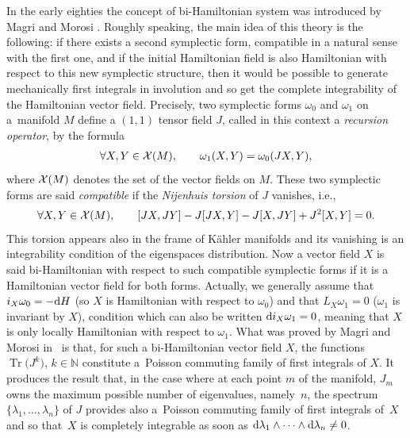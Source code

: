 \documentclass[pdftex]{sigma}%
\numberwithin{equation}{section}
\begin{document}
In the early eighties the concept of bi-Hamiltonian system was introduced by Magri and Morosi \cite{MaMo}. Roughly speaking, the main idea of this theory is the following: if there exists a second symplectic form, compatible in a natural sense with the first one, and if the initial Hamiltonian field is also Hamiltonian with respect to this new symplectic structure, then it would be possible to generate mechanically first integrals in involution and so get the complete integrability of the Hamiltonian vector field. Precisely, two symplectic forms $\omega_0$ and $\omega_1$ on a~manifold $M$ define a $(1,1)$ tensor field $J$, called in this context a {\it recursion operator}, by the formula
\begin{gather*}
\forall X,Y\in{\cal X}(M),\qquad \omega_1(X,Y)=\omega_0(JX,Y),
\end{gather*}
where ${\cal X}(M)$ denotes the set of the vector fields on $M$.
These two symplectic forms are said {\it compatible} if the {\it Nijenhuis torsion} of $J$ \cite{Nij} vanishes, i.e.,
\begin{gather*}
\forall X,Y\in{\cal X}(M),\qquad [JX,JY]-J[JX,Y]-J[X,JY]+J^2[X,Y]=0.
\end{gather*}
This torsion appears also in the frame of K\"ahler manifolds and its vanishing is an integrability condition of the eigenspaces distribution.
Now a vector field $X$ is said bi-Hamiltonian with respect to such compatible symplectic forms if it is a Hamiltonian vector field for both forms. Actually, we generally assume that $i_X\omega_0=-{\rm d}H$ (so $X$ is Hamiltonian with respect to $\omega_0$) and that $L_X\omega_1=0$ ($\omega_1$ is invariant by $X$), condition which can also be written ${\rm d}i_X\omega_1=0$, meaning that $X$ is only locally Hamiltonian with respect to $\omega_1$.
What was proved by Magri and Morosi in~\cite{MaMo} is that, for such a bi-Hamiltonian vector field $X$, the functions $\operatorname{Tr}\big(J^k\big)$, $k\in\mathbb{N}$ constitute a~Poisson commuting family of first integrals of $X$. It produces the result that, in the case where at each point $m$ of the manifold, $J_m$ owns the maximum possible number of eigenvalues, namely~$n$, the spectrum $\{\lambda_1,\dots,\lambda_n\}$ of $J$ provides also a~Poisson commuting family of first integrals of~$X$ and so that~$X$ is completely integrable as soon as ${\rm d}\lambda_1\wedge\cdots\wedge {\rm d}\lambda_n\not=0$.
\end{document}

